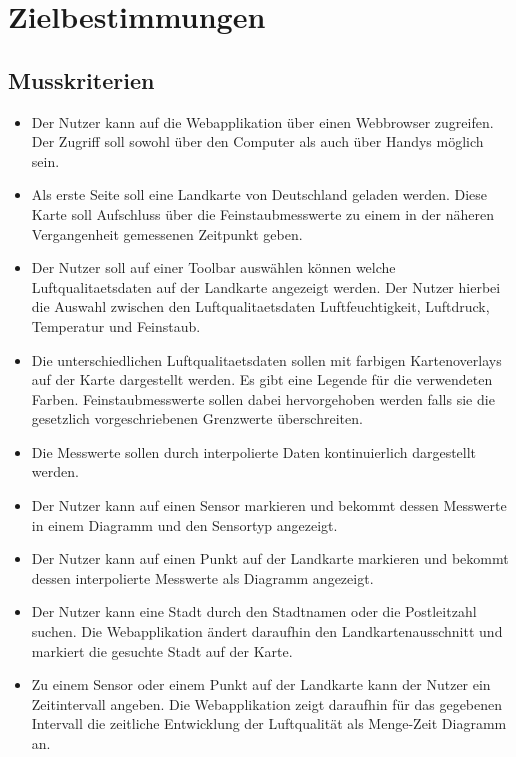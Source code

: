 \section{Zielbestimmungen}
\subsection{Musskriterien}
 \begin{itemize}
	\item Der Nutzer kann auf die Webapplikation über einen Webbrowser zugreifen. 
	Der Zugriff soll sowohl über den Computer als auch über Handys möglich sein.

	\item Als erste Seite soll eine Landkarte von Deutschland geladen werden.
	Diese Karte soll Aufschluss über die Feinstaubmesswerte zu einem in der näheren Vergangenheit gemessenen Zeitpunkt geben.

	\item Der Nutzer soll auf einer \gls{Toolbar} auswählen können welche \gls{Luftqualitaetsdaten} auf der Landkarte angezeigt werden. 
	Der Nutzer hierbei die Auswahl zwischen den \gls{Luftqualitaetsdaten} Luftfeuchtigkeit, Luftdruck, Temperatur und \gls{Feinstaub}.

	\item Die unterschiedlichen \gls{Luftqualitaetsdaten} sollen mit farbigen \glspl{Kartenoverlay} auf der Karte dargestellt werden. 
	Es gibt eine Legende für die verwendeten Farben. Feinstaubmesswerte sollen dabei hervorgehoben werden falls sie die gesetzlich vorgeschriebenen Grenzwerte überschreiten.
	
	\item Die Messwerte sollen durch interpolierte Daten kontinuierlich dargestellt werden.
	
	\item Der Nutzer kann auf einen \gls{Sensor} markieren und bekommt dessen Messwerte in einem Diagramm und den Sensortyp angezeigt.
	
	\item Der Nutzer kann auf einen Punkt auf der Landkarte markieren und bekommt dessen interpolierte Messwerte als Diagramm angezeigt.

	\item Der Nutzer kann eine Stadt durch den Stadtnamen oder die Postleitzahl suchen. 
	Die Webapplikation ändert daraufhin den Landkartenausschnitt und markiert die gesuchte Stadt auf der Karte.

	\item  Zu einem \gls{Sensor} oder einem Punkt auf der Landkarte kann der Nutzer ein Zeitintervall angeben. Die Webapplikation zeigt daraufhin für das gegebenen Intervall 
	die zeitliche Entwicklung der Luftqualität als Menge-Zeit Diagramm an.


\end{itemize}
